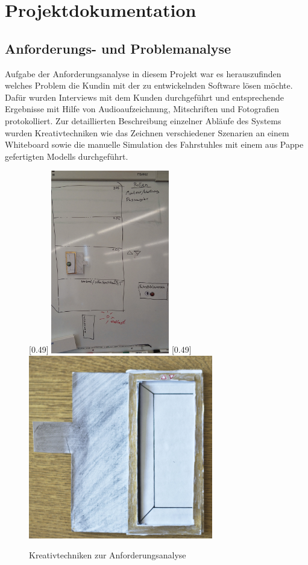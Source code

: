 \part{Projektdokumentation}

\chapter{Anforderungs- und Problemanalyse}
Aufgabe der Anforderungsanalyse in diesem Projekt war es herauszufinden welches Problem die Kundin mit der zu entwickelnden Software lösen möchte. Dafür wurden Interviews mit dem Kunden durchgeführt und entsprechende Ergebnisse mit Hilfe von Audioaufzeichnung, Mitschriften und Fotografien protokolliert. Zur detaillierten Beschreibung einzelner Abläufe des Systems wurden Kreativtechniken wie das Zeichnen verschiedener Szenarien an einem Whiteboard sowie die manuelle Simulation des Fahrstuhles mit einem aus Pappe gefertigten Modells durchgeführt.
\begin{figure}[hbt]
\hspace*{-1.2cm}
[0.49\linewidth]
{\includegraphics[height=8cm]{images/kundengespraech1.jpg}}
[0.49\linewidth]
{\includegraphics[height=8cm]{images/pappfahrstuhl.jpg}}
\caption{Kreativtechniken zur Anforderungsanalyse}
\end{figure}

